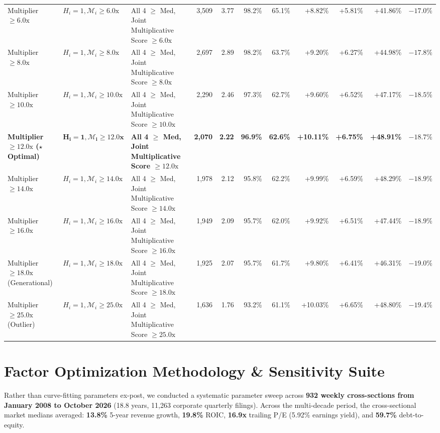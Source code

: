 \documentclass[10pt,twocolumn]{article}
\begin{document}
\begin{table}[t!]
{\begin{tabular}{lllrrrrrrrr}
Multiplier $\ge 6.0\text{x}$ & $H_i = 1, \mathcal{M}_i \ge 6.0\text{x}$ & All 4 $\ge$ Med, Joint Multiplicative Score $\ge 6.0\text{x}$ & 3,509 & 3.77 & 98.2\% & 65.1\% & +8.82\% & +5.81\% & +41.86\% & $-17.0\%$ \\
Multiplier $\ge 8.0\text{x}$ & $H_i = 1, \mathcal{M}_i \ge 8.0\text{x}$ & All 4 $\ge$ Med, Joint Multiplicative Score $\ge 8.0\text{x}$ & 2,697 & 2.89 & 98.2\% & 63.7\% & +9.20\% & +6.27\% & +44.98\% & $-17.8\%$ \\
Multiplier $\ge 10.0\text{x}$ & $H_i = 1, \mathcal{M}_i \ge 10.0\text{x}$ & All 4 $\ge$ Med, Joint Multiplicative Score $\ge 10.0\text{x}$ & 2,290 & 2.46 & 97.3\% & 62.7\% & +9.60\% & +6.52\% & +47.17\% & $-18.5\%$ \\
\textbf{Multiplier $\ge 12.0\text{x}$ ($\star$ Optimal)} & $\mathbf{H_i = 1, \mathcal{M}_i \ge 12.0\text{x}}$ & \textbf{All 4 $\ge$ Med, Joint Multiplicative Score $\ge 12.0\text{x}$} & \textbf{2,070} & \textbf{2.22} & \textbf{96.9\%} & \textbf{62.6\%} & \textbf{+10.11\%} & \textbf{+6.75\%} & \textbf{+48.91\%} & \textbf{$-18.7\%$} \\
Multiplier $\ge 14.0\text{x}$ & $H_i = 1, \mathcal{M}_i \ge 14.0\text{x}$ & All 4 $\ge$ Med, Joint Multiplicative Score $\ge 14.0\text{x}$ & 1,978 & 2.12 & 95.8\% & 62.2\% & +9.99\% & +6.59\% & +48.29\% & $-18.9\%$ \\
Multiplier $\ge 16.0\text{x}$ & $H_i = 1, \mathcal{M}_i \ge 16.0\text{x}$ & All 4 $\ge$ Med, Joint Multiplicative Score $\ge 16.0\text{x}$ & 1,949 & 2.09 & 95.7\% & 62.0\% & +9.92\% & +6.51\% & +47.44\% & $-18.9\%$ \\
Multiplier $\ge 18.0\text{x}$ (Generational) & $H_i = 1, \mathcal{M}_i \ge 18.0\text{x}$ & All 4 $\ge$ Med, Joint Multiplicative Score $\ge 18.0\text{x}$ & 1,925 & 2.07 & 95.7\% & 61.7\% & +9.80\% & +6.41\% & +46.31\% & $-19.0\%$ \\
Multiplier $\ge 25.0\text{x}$ (Outlier) & $H_i = 1, \mathcal{M}_i \ge 25.0\text{x}$ & All 4 $\ge$ Med, Joint Multiplicative Score $\ge 25.0\text{x}$ & 1,636 & 1.76 & 93.2\% & 61.1\% & +10.03\% & +6.65\% & +48.80\% & $-19.4\%$ \\
\bottomrule
\end{tabular}%
}
\end{table}

\section{Factor Optimization Methodology \& Sensitivity Suite}
Rather than curve-fitting parameters ex-post, we conducted a systematic parameter sweep across \textbf{932 weekly cross-sections from January 2008 to October 2026} (18.8 years, 11,263 corporate quarterly filings). Across the multi-decade period, the cross-sectional market medians averaged: \textbf{13.8\%} 5-year revenue growth, \textbf{19.8\%} ROIC, \textbf{16.9x} trailing P/E (5.92\% earnings yield), and \textbf{59.7\%} debt-to-equity.
\end{document}
